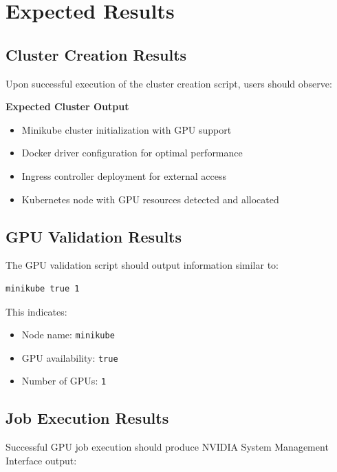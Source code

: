 \documentclass[12pt,a4paper]{report}
\begin{document}
\chapter{Expected Results}
\label{chap:expected-results}

\section{Cluster Creation Results}
Upon successful execution of the cluster creation script, users should observe:

\begin{center}
\colorbox{primarycolor}{
    \color{white}\textbf{Expected Cluster Output}
}
\end{center}

\vspace{0.3cm}

\begin{itemize}
    \item Minikube cluster initialization with GPU support
    \item Docker driver configuration for optimal performance
    \item Ingress controller deployment for external access
    \item Kubernetes node with GPU resources detected and allocated
\end{itemize}

\section{GPU Validation Results}
The GPU validation script should output information similar to:

\begin{lstlisting}[language=bash,caption=Expected GPU Validation Output,label=lst:gpu-output]
minikube true 1
\end{lstlisting}

This indicates:
\begin{itemize}
    \item Node name: \texttt{minikube}
    \item GPU availability: \texttt{true}
    \item Number of GPUs: \texttt{1}
\end{itemize}

\section{Job Execution Results}
Successful GPU job execution should produce NVIDIA System Management Interface output:
\end{document}

